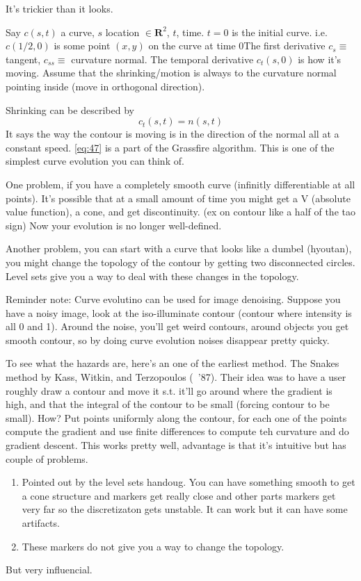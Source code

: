 It's trickier than it looks.

Say $c(s,t)$ a curve, $s$ location $\in \mathbf{R}^2$, $t$, time. $t=0$ is the initial
curve. i.e. $c(1/2, 0)$ is some point $(x,y)$ on the curve at time
0The first derivative $c_s \equiv$ tangent, $c_{ss} \equiv$ curvature
normal. The temporal derivative $c_t(s,0)$ is how it's moving. Assume that the
shrinking/motion is always to the curvature normal pointing inside (move in orthogonal
direction).

Shrinking can be described by
\begin{equation}
  \label{eq:47}
c_t(s,t) = n(s,t)
\end{equation}
 It says the way the
contour is moving is in the direction of the normal all at a constant
speed. \eqref{eq:47} is a part of the Grassfire algorithm. This is one
of the simplest curve evolution you can think of. 

One problem, if you have a completely smooth curve (infinitly
differentiable at all points). It's possible that at a small amount of
time you might get a V (absolute value function), a cone, and get
discontinuity. (ex on contour like a half of the tao sign) Now your
evolution is no longer well-defined. 

Another problem, you can start with a curve that looks like a dumbel
(hyoutan), you might change the topology of the contour by getting two
disconnected circles. Level sets give you a way to deal with these
changes in the topology.

Reminder note: Curve evolutino can be used for image
denoising. Suppose you have a noisy image, look at the iso-illuminate
contour (contour where intensity is all 0 and 1). Around the noise,
you'll get weird contours, around objects you get smooth contour, so
by doing curve evolution noises disappear pretty quicky.

To see what the hazards are, here's an one of the earliest method. The
Snakes method by Kass, Witkin, and Terzopoulos (~'87). Their idea was
to have a user roughly draw a contour and move it s.t. it'll go around
where the gradient is high, and that the integral of the contour to be
small (forcing contour to be small). How? Put points uniformly along
the contour, for each one of the points compute the gradient and use
finite differences to compute teh curvature and do gradient
descent. This works pretty well, advantage is that it's intuitive but
has couple of problems. 
\begin{enumerate}
\item Pointed out by the level sets handoug. You can have something
  smooth to get a cone structure and markers get really close and
  other parts markers get very far so the discretizaton gets
  unstable. It can work but it can have some artifacts.
\item These markers do not give you a way to change the topology.
\end{enumerate}
But very influencial.

